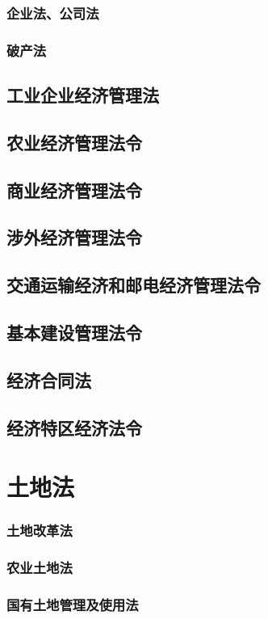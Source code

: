 \documentclass[UTF8]{../ApplicationUniverse}
\begin{document}
        \subsubsection{企业法、公司法}
        \subsubsection{破产法}
    \subsection{工业企业经济管理法}
    \subsection{农业经济管理法令}
    \subsection{商业经济管理法令}
    \subsection{涉外经济管理法令}
    \subsection{交通运输经济和邮电经济管理法令}
    \subsection{基本建设管理法令}
    \subsection{经济合同法}
    \subsection{经济特区经济法令}

\section{土地法}
        \subsubsection{土地改革法}
        \subsubsection{农业土地法}
        \subsubsection{国有土地管理及使用法}
\end{document}
